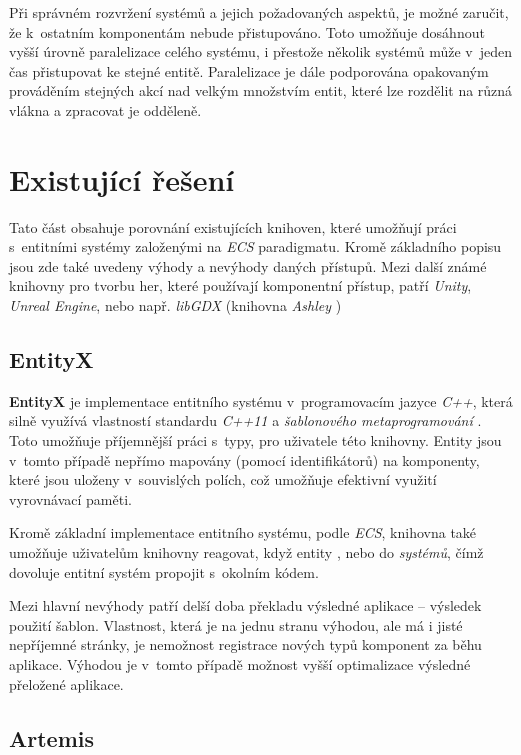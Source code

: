 Při správném rozvržení systémů a jejich požadovaných aspektů, je možné zaručit, že k~ostatním komponentám nebude přistupováno. Toto umožňuje dosáhnout vyšší úrovně paralelizace celého systému, i přestože několik systémů může v~jeden čas přistupovat ke stejné entitě. Paralelizace je dále podporována opakovaným prováděním stejných akcí nad velkým množstvím entit, které lze rozdělit na různá vlákna a zpracovat je odděleně.

\section{Existující řešení}

Tato část obsahuje porovnání existujících knihoven, které umožňují práci s~entitními systémy založenými na \emph{ECS} paradigmatu. Kromě základního popisu jsou zde také uvedeny výhody a nevýhody daných přístupů. Mezi další známé knihovny pro tvorbu her, které používají komponentní přístup, patří \emph{Unity}, \emph{Unreal Engine}, nebo např. \emph{libGDX} (knihovna \emph{Ashley} \cite{Ashley})

\subsection{EntityX}

\textbf{EntityX} \cite{EntityX} je implementace entitního systému v~programovacím jazyce \emph{C++}, která silně využívá vlastností standardu \emph{C++11} a \emph{šablonového metaprogramování} \cite{CppMetaprogramming}. Toto umožňuje příjemnější práci s~typy, pro uživatele této knihovny. Entity jsou v~tomto případě nepřímo mapovány (pomocí identifikátorů) na komponenty, které jsou uloženy v~souvislých polích, což umožňuje efektivní využití vyrovnávací paměti. 

Kromě základní implementace entitního systému, podle \emph{ECS}, knihovna také umožňuje uživatelům knihovny reagovat, když entity , nebo  do \emph{systémů}, čímž dovoluje entitní systém propojit s~okolním kódem.

Mezi hlavní nevýhody patří delší doba překladu výsledné aplikace -- výsledek použití šablon. Vlastnost, která je na jednu stranu výhodou, ale má i jisté nepříjemné stránky, je nemožnost registrace nových typů komponent za běhu aplikace. Výhodou je v~tomto případě možnost vyšší optimalizace výsledné přeložené aplikace.

\subsection{Artemis}

